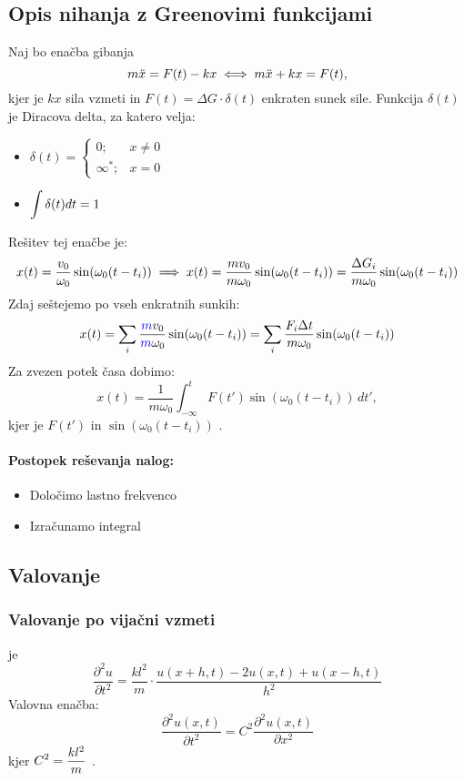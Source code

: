 \subsection{Opis nihanja z Greenovimi funkcijami}
Naj bo enačba gibanja \[m\ddot{x} = F(t) - kx \iff m \ddot{x} + kx = F(t),\] kjer je \(kx\) sila vzmeti in \(F(t) = \Delta G \cdot \delta(t)\) enkraten sunek sile. Funkcija \(\delta(t)\) je Diracova delta, za katero velja:
\begin{itemize}
    \item \(\delta(t) = \begin{cases}
        0; &x \neq 0 \\ \infty^*; &x=0
    \end{cases}\)
    \item \(\displaystyle \int \delta(t) dt = 1\)
\end{itemize}
%
Rešitev tej enačbe je:
\[\displaystyle x(t) = \frac{v_0}{\omega_0} \sin(\omega_0 (t - t_i)) \implies x(t) = \frac{mv_0}{m\omega_0} \sin(\omega_0 (t - t_i)) = \frac{\Delta G_i}{m\omega_0} \sin(\omega_0 (t - t_i))\]
%
Zdaj seštejemo po vseh enkratnih sunkih:
\[
x(t) = \sum_i \frac{\textcolor{blue}{m}v_0}{\textcolor{blue}{m}\omega_0} \sin(\omega_0 (t - t_i)) = \sum_i \frac{F_i \Delta t}{m\omega_0}\sin(\omega_0 (t - t_i))
\]
%
Za zvezen potek časa dobimo:
\[
x(t) = \frac{1}{m\omega_0} \int_{-\infty}^{t} F(t') \sin(\omega_0 (t - t_i)) \, dt',
\]
%
kjer je \(F(t')\)  in \(\sin(\omega_0 (t - t_i))\) .
%
\paragraph{Postopek reševanja nalog:}
\begin{itemize}
    \item Določimo lastno frekvenco
    \item Izračunamo integral
\end{itemize}

\subsection{Valovanje}
\subsubsection*{Valovanje po vijačni vzmeti}
 je
%
\[
    \frac{\partial^2 u}{\partial t^2} = \frac{kl^2}{m} \cdot \frac{u(x+h, t) - 2u(x, t) + u(x -h, t)}{h^2}
\]
%
Valovna enačba:
%
\[
    \boxed{\frac{\partial^2 u(x, t)}{\partial t^2} = C^2 \frac{\partial^2u(x,t)}{\partial x^2}}
\]
%
kjer \(\displaystyle C^2 = \frac{kl^2}{m}\) .

